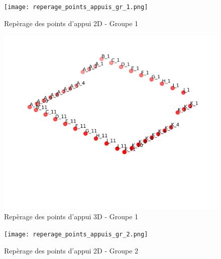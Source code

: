 
    \begin{figure}[H] %
        \centering %
        \texttt{[image: reperage\_points\_appuis\_gr\_1.png]} %
        \caption{Repèrage des points d'appui 2D - Groupe 1} %
    \end{figure}

    \begin{figure}[H] %
        \centering %
        \includegraphics[width=\textwidth]{assets/img/reperage_points_appuis_3D_gr_1_cropped.png} %
        \caption{Repèrage des points d'appui 3D - Groupe 1} %
   \end{figure}
    
    \begin{figure}[H] %
        \centering %
        \texttt{[image: reperage\_points\_appuis\_gr\_2.png]} %
        \caption{Repèrage des points d'appui 2D - Groupe 2} %
    \end{figure}

